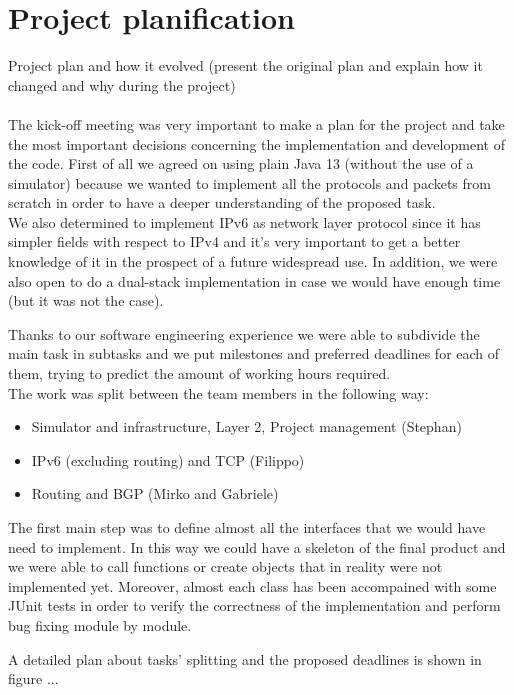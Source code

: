 \chapter{Project planification}
Project plan and how it evolved (present the original plan and explain how it changed and why during the project)\\\\

The kick-off meeting was very important to make a plan for the project and take the most important
decisions concerning the implementation and development of the code.
First of all we agreed on using plain Java 13 (without the use of a simulator) because we
wanted to implement all the protocols and packets from scratch in order to have a deeper
understanding of the proposed task.\\
We also determined to implement IPv6 as network layer protocol since it has simpler fields with respect to IPv4 and 
it's very important to get a better knowledge of it in the prospect of a future widespread use. In addition, we were 
also open to do a dual-stack implementation in case we would have enough time (but it was not the case).

Thanks to our software engineering experience we were able to subdivide the main task in 
subtasks and we put milestones and preferred deadlines for each of them, trying to predict
the amount of working hours required.\\
The work was split between the team members in the following way:
\begin{itemize}
    \item Simulator and infrastructure, Layer 2, Project management (Stephan) 
    \item IPv6 (excluding routing) and TCP (Filippo)
    \item Routing and BGP (Mirko and Gabriele)
\end{itemize}

The first main step was to define almost all the interfaces that we would have need to implement.
In this way we could have a skeleton of the final product and we were able to call functions
or create objects that in reality were not implemented yet.
Moreover, almost each class has been accompained with some JUnit tests in order to verify
the correctness of the implementation and perform bug fixing module by module.

A detailed plan about tasks' splitting and the proposed deadlines is shown in figure ...


